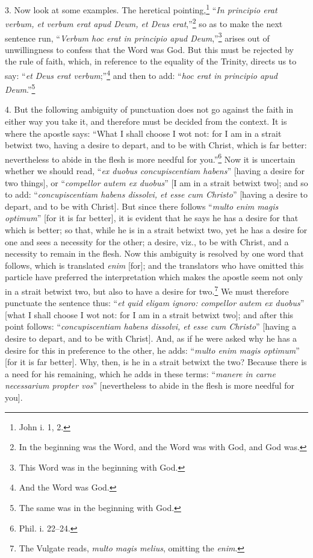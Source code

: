 3. Now look at some examples. The heretical pointing,\footnote{John i. 1, 2.} “\emph{In principio erat verbum, et verbum erat apud Deum, et Deus erat},”\footnote{In the beginning was the Word, and the Word was with God, and God was.} so as to make the next sentence run, “\emph{Verbum hoc erat in principio apud Deum},”\footnote{This Word was in the beginning with God.} arises out of unwillingness to confess that the Word was God. But this must be rejected by the rule of faith, which, in reference to the equality of the Trinity, directs us to say: “\emph{et Deus erat verbum};”\footnote{And the Word was God.} and then to add: “\emph{hoc erat in principio apud Deum}.”\footnote{The same was in the beginning with God.}

4. But the following ambiguity of punctuation does not go against the faith in either way you take it, and therefore must be decided from the context. It is where the apostle says: “What I shall choose I wot not: for I am in a strait betwixt two, having a desire to depart, and to be with Christ, which is far better: nevertheless to abide in the flesh is more needful for you.”\footnote{Phil. i. 22–24.} Now it is uncertain whether we should read, “\emph{ex duobus concupiscentiam habens}” [having a desire for two things], or “\emph{compellor autem ex duobus}” [I am in a strait betwixt two]; and so to add: “\emph{concupiscentiam habens dissolvi, et esse cum Christo}” [having a desire to depart, and to be with Christ]. But since there follows “\emph{multo enim magis optimum}” [for it is far better], it is evident that he says he has a desire for that which is better; so that, while he is in a strait betwixt two, yet he has a desire for one and sees a necessity for the other; a desire, viz., to be with Christ, and a necessity to remain in the flesh. Now this ambiguity is resolved by one word that follows, which is translated \emph{enim} [for]; and the translators who have omitted this particle have preferred the interpretation which makes the apostle seem not only in a strait betwixt two, but also to have a desire for two.\footnote{The Vulgate reads, \emph{multo magis melius}, omitting the \emph{enim}.} We must therefore punctuate the sentence thus: “\emph{et quid eligam ignoro: compellor autem ex duobus}” [what I shall choose I wot not: for I am in a strait betwixt two]; and after this point follows: “\emph{concupiscentiam habens dissolvi, et esse cum Christo}” [having a desire to depart, and to be with Christ]. And, as if he were asked why he has a desire for this in preference to the other, he adds: “\emph{multo enim magis optimum}” [for it is far better]. Why, then, is he in a strait betwixt the two? Because there is a need for his remaining, which he adds in these terms: “\emph{manere in carne necessarium propter vos}” [nevertheless to abide in the flesh is more needful for you].


